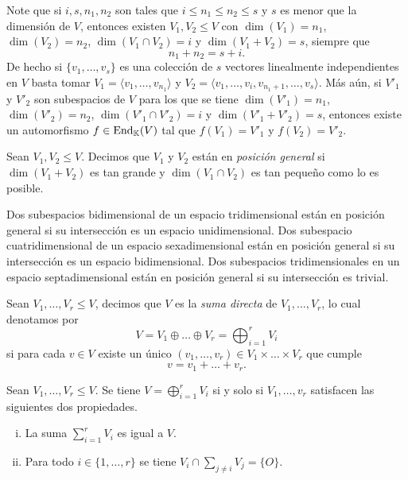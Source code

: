 \begin{obs}
Note que si $i,s,n_1,n_2$ son tales que $i\le n_1\le n_2\le s$ y $s$ es menor que la dimensi\'on de $V$, entonces existen $V_1,V_2\le V$ con $\dim(V_1)=n_1$, $\dim(V_2)=n_2$, $\dim(V_1\cap V_2)=i$ y $\dim(V_1+V_2)=s$, siempre que
\[
n_1+n_2=s+i.
\]
De hecho si $\{v_1,\ldots,v_s\}$ es una colecci\'on de $s$ vectores linealmente independientes en $V$ basta tomar
$V_1=\langle v_1,\ldots,v_{n_1}\rangle$ y  $V_2=\langle v_1,\ldots,v_i,v_{n_1+1},\ldots,v_s\rangle$.
M\'as a\'un, si $V'_1$ y $V'_2$ son subespacios de $V$ para los que se tiene $\dim(V'_1)=n_1$, $\dim(V'_2)=n_2$, $\dim(V'_1\cap V'_2)=i$ y $\dim(V'_1+V'_2)=s$, entonces existe un automorfismo $f\in\operatorname{End}_\mathbb{K}(V)$ tal que $f(V_1)=V'_1$ y $f(V_2)=V'_2$.
\end{obs}

\begin{defn}
Sean $V_1,V_2\le V$. Decimos que $V_1$ y $V_2$ est\'an en \emph{posici\'on general} si $\dim(V_1+V_2)$ es tan grande y $\dim(V_1\cap V_2)$ es tan peque\~no como lo es posible.
\end{defn}

\begin{ejem}
Dos subespacios bidimensional de un espacio tridimensional est\'an en posici\'on general si su intersecci\'on es un espacio unidimensional. Dos subespacio cuatridimensional de un espacio sexadimensional est\'an en posici\'on general si su intersecci\'on es un espacio bidimensional. Dos subespacios tridimensionales en un espacio septadimensional est\'an en posici\'on general si su intersecci\'on es trivial.
\end{ejem}

\begin{defn}
Sean $V_1,\ldots,V_r\le V$, decimos que $V$ es la \emph{suma directa} de $V_1,\ldots,V_r$, lo cual denotamos por
\[
V=V_1\oplus\ldots\oplus V_r=\bigoplus_{i=1}^r V_i
\]
si para cada $v\in V$ existe un \'unico $(v_1,\ldots,v_r)\in V_1\times\ldots\times V_r$ que cumple
\[
v=v_1+\ldots+v_r.
\]
\end{defn}

\begin{prop}\label{sumadirsiysolosi}
Sean $V_1,\ldots,V_r\le V$. Se tiene $V=\bigoplus_{i=1}^r V_i$ si y solo si $V_1,\ldots,v_r$ satisfacen las siguientes dos propiedades.
\begin{enumerate}[(i)]
\item La suma $\sum_{i=1}^r V_i$ es igual a $V$.
\item Para todo $i\in\{1,\ldots,r\}$ se tiene $V_i\cap\sum_{j\ne i} V_j=\{O\}$.
\end{enumerate}
\end{prop}

